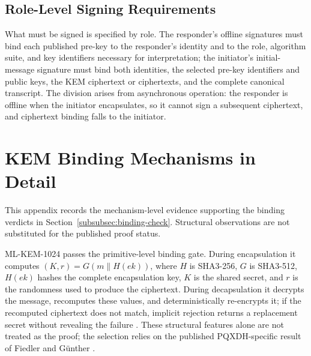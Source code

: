 \subsection{Role-Level Signing Requirements}
\label{app:role-signing-requirements}

What must be signed is specified by role. The responder's offline signatures must bind each published pre-key to the responder's identity and to the role, algorithm suite, and key identifiers necessary for interpretation; the initiator's initial-message signature must bind both identities, the selected pre-key identifiers and public keys, the KEM ciphertext or ciphertexts, and the complete canonical transcript. The division arises from asynchronous operation: the responder is offline when the initiator encapsulates, so it cannot sign a subsequent ciphertext, and ciphertext binding falls to the initiator.

\section{KEM Binding Mechanisms in Detail}
\label{app:binding-detail}

This appendix records the mechanism-level evidence supporting the binding verdicts in Section~\ref{subsubsec:binding-check}. Structural observations are not substituted for the published proof status.

ML-KEM-1024 passes the primitive-level binding gate. During encapsulation it computes \((K,r)=G(m \parallel H(ek))\), where \(H\) is SHA3-256, \(G\) is SHA3-512, \(H(ek)\) hashes the complete encapsulation key, \(K\) is the shared secret, and \(r\) is the randomness used to produce the ciphertext. During decapsulation it decrypts the message, recomputes these values, and deterministically re-encrypts it; if the recomputed ciphertext does not match, implicit rejection returns a replacement secret without revealing the failure \cite{national_institute_of_standards_and_technology_us_module-lattice-based_2024-1}. These structural features alone are not treated as the proof; the selection relies on the published PQXDH-specific result of Fiedler and G\"unther \cite{fiedler_security_2024}.

